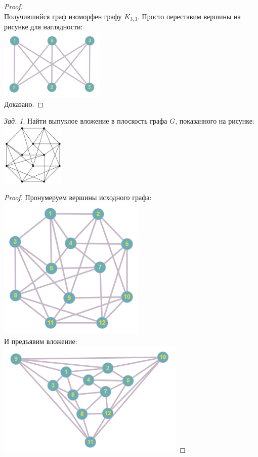\documentclass[a4paper,12pt]{article}
\numberwithin{figure}{section}
\theoremstyle{remark}
\newtheorem{problem}{Зад.}[section]
\begin{document}
\begin{proof}
	\\ Получившийся граф изоморфен графу $K_{3,3}$. Просто переставим вершины на рисунке для наглядности:
	\\ \includegraphics[width=5cm]{kuratovsky-task2-stage4.png}
	\\ Доказано.
\end{proof}


\begin{problem}
	Найти выпуклое вложение в плоскость графа $G$, показанного на рисунке:
	\\ \includegraphics[width=3cm]{kuratovsky-task3-stage0.png}
\end{problem}
\begin{proof}
	Пронумеруем вершины исходного графа:
	\\ \includegraphics[width=7cm]{kuratovsky-task3-stage1.png}
	\\ И предъявим вложение:
	\\ \includegraphics[width=9cm]{kuratovsky-task3-stage2.png}
\end{proof}
\end{document}
